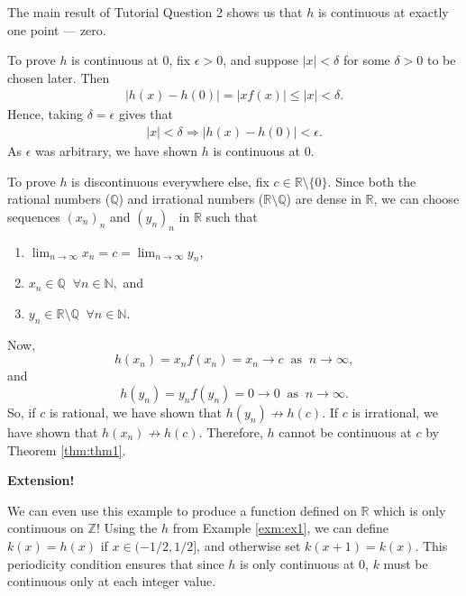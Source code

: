 \documentclass[
  10pt,
  a4paper]{article}
\providecommand{\tightlist}{%
  \setlength{\itemsep}{0pt}\setlength{\parskip}{0pt}}
\theoremstyle{plain}
\theoremstyle{definition}
\theoremstyle{plain}
\theoremstyle{plain}
\theoremstyle{plain}
\theoremstyle{plain}
\theoremstyle{definition}
\theoremstyle{definition}
\theoremstyle{remark}
\theoremstyle{remark}
\let\BeginKnitrBlock\begin \let\EndKnitrBlock\end
\begin{document}
\BeginKnitrBlock{solution*}
The main result of Tutorial Question 2 shows us that \(h\) is continuous at exactly one point --- zero.

To prove \(h\) is continuous at \(0\), fix \(\epsilon > 0\), and suppose \(\lvert x \rvert < \delta\) for some \(\delta > 0\) to be chosen later. Then
\begin{align*}
\lvert h(x) - h(0) \rvert = \lvert x f(x) \rvert \leq \lvert x \rvert < \delta.
\end{align*}
Hence, taking \(\delta = \epsilon\) gives that
\begin{align*}
\lvert x \rvert < \delta \Longrightarrow \lvert h(x) - h(0) \rvert < \epsilon.
\end{align*}
As \(\epsilon\) was arbitrary, we have shown \(h\) is continuous at \(0\).

To prove \(h\) is discontinuous everywhere else, fix \(c \in \mathbb{R}\setminus \lbrace 0 \rbrace.\) Since both the rational numbers (\(\mathbb{Q}\)) and irrational numbers (\(\mathbb{R}\setminus\mathbb{Q}\)) are dense in \(\mathbb{R}\), we can choose sequences \((x_n)_n\) and \((y_n)_n\) in \(\mathbb{R}\) such that

\begin{enumerate}
\def\labelenumi{\arabic{enumi}.}
\tightlist
\item
  \(\lim_{n \to \infty} x_n = c = \lim_{n \to \infty} y_n\),
\item
  \(x_n \in \mathbb{Q}\;\;\forall n \in \mathbb{N},\) and
\item
  \(y_n \in \mathbb{R}\setminus\mathbb{Q}\;\;\forall n \in \mathbb{N}.\)
\end{enumerate}

Now, \[h(x_n) = x_n f(x_n) = x_n \to c \;\;\text{as}\;\; n \to \infty,\] and \[h(y_n) = y_n f(y_n) = 0 \to 0 \;\;\text{as}\;\; n \to \infty.\] So, if \(c\) is rational, we have shown that \(h(y_n)\not\to h(c)\). If \(c\) is irrational, we have shown that \(h(x_n)\not\to h(c)\). Therefore, \(h\) cannot be continuous at \(c\) by Theorem \ref{thm:thm1}.
\EndKnitrBlock{solution*}

\textbf{Extension!}

\BeginKnitrBlock{example}
{\label{exm:ex2} }We can even use this example to produce a function defined on \(\mathbb{R}\) which is only continuous on \(\mathbb{Z}\)! Using the \(h\) from Example \ref{exm:ex1}, we can define \(k(x) = h(x)\) if \(x \in (-1/2, 1/2]\), and otherwise set \(k(x + 1) = k(x).\) This periodicity condition ensures that since \(h\) is only continuous at \(0\), \(k\) must be continuous only at each integer value.
\EndKnitrBlock{example}
\end{document}
